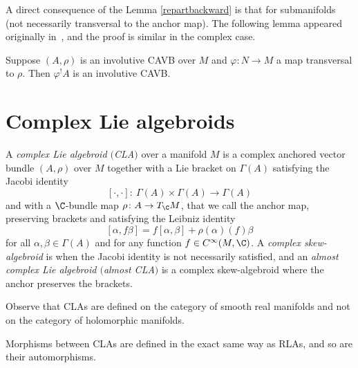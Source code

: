 A direct consequence of the Lemma \ref{repartbackward} is that  for submanifolds  (not necessarily transversal to the anchor map).
The following lemma appeared originally in~\cite{bursztyn2019splitting}, and the proof is similar in the complex case.
\begin{Lemma}
   Suppose $(A,\rho)$ is an involutive CAVB over $M$ and $\varphi\colon N\to M$ a map transversal to $\rho$. Then $\varphi^! A$ is an involutive CAVB.
\end{Lemma}

 \section{Complex Lie algebroids}\label{CLA}
\begin{Definition}%
A {\em complex Lie algebroid $($CLA$)$} over a manifold $M$ is a complex anchored vector bundle $(A, \rho)$ over $M$ together with a Lie bracket on $\Gamma(A)$ satisfying the Jacobi identity
\[[\cdot,\cdot]\colon \ \Gamma(A)\times \Gamma(A)\to\Gamma(A)\]
 and with a $\C$-bundle map $\rho\colon A\to T_{\C}M$, that we call the anchor map, preserving brackets and satisfying the Leibniz identity
 \[[\alpha,f \beta]=f[\alpha,\beta]+\rho(\alpha)(f)\beta\]
 for all $\alpha,\beta\in \Gamma(A)$ and for any function $f\in C^{\infty}(M,\C)$. A {\em complex skew-algebroid} is when the Jacobi identity is not necessarily satisfied, and an {\em almost complex Lie algebroid $($almost CLA$)$} is a complex skew-algebroid where the anchor preserves the brackets.
\end{Definition}

\begin{Remark}
Observe that CLAs are defined on the category of smooth real manifolds and not on the category of holomorphic manifolds.
\end{Remark}
Morphisms between CLAs are defined in the exact same way as RLAs, and so are their automorphisms.
